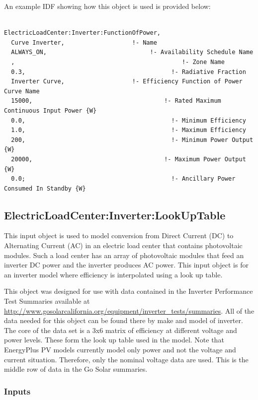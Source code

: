 An example IDF showing how this object is used is provided below:

\begin{lstlisting}

ElectricLoadCenter:Inverter:FunctionOfPower,
  Curve Inverter,                   !- Name
  ALWAYS_ON,                             !- Availability Schedule Name
  ,                                               !- Zone Name
  0.3,                                         !- Radiative Fraction
  Inverter Curve,                   !- Efficiency Function of Power Curve Name
  15000,                                     !- Rated Maximum Continuous Input Power {W}
  0.0,                                         !- Minimum Efficiency
  1.0,                                         !- Maximum Efficiency
  200,                                         !- Minimum Power Output {W}
  20000,                                     !- Maximum Power Output {W}
  0.0;                                         !- Ancillary Power Consumed In Standby {W}
\end{lstlisting}

\subsection{ElectricLoadCenter:Inverter:LookUpTable}\label{electricloadcenterinverterlookuptable}

This input object is used to model conversion from Direct Current (DC) to Alternating Current (AC) in an electric load center that contains photovoltaic modules. Such a load center has an array of photovoltaic modules that feed an inverter DC power and the inverter produces AC power. This input object is for an inverter model where efficiency is interpolated using a look up table.

This object was designed for use with data contained in the Inverter Performance Test Summaries available at \url{http://www.gosolarcalifornia.org/equipment/inverter_tests/summaries}. All of the data needed for this object can be found there by make and model of inverter. The core of the data set is a 3x6 matrix of efficiency at different voltage and power levels. These form the look up table used in the model. Note that EnergyPlus PV models currently model only power and not the voltage and current situation. Therefore, only the nominal voltage data are used. This is the middle row of data in the Go Solar summaries.

\subsubsection{Inputs}\label{inputs-5-008}

